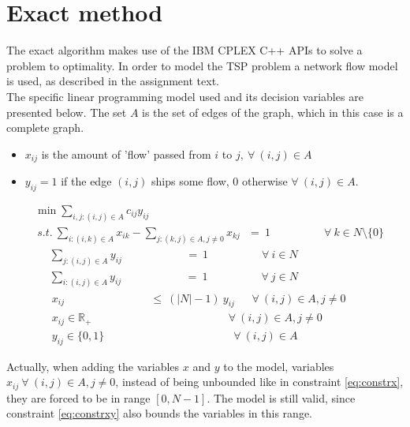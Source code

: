 
\section{Exact method}
\label{chap:cplexm}
The exact algorithm makes use of the IBM CPLEX C++ APIs to solve a problem to optimality. In order to model the TSP problem a network flow model is used, as described in the assignment text. \\
The specific linear programming model used and its decision variables are presented below. The set $A$ is the set of edges of the graph, which in this case is a complete graph.
\begin{itemize}
	\item $x_{ij}$ is the amount of 'flow' passed from $i$ to $j,~\forall~(i,j)\in A$
	\item $y_{ij} = 1$ if the edge $(i,j)$ ships some flow, $0$ otherwise $\forall~(i,j)\in A$.
\end{itemize}
\begin{align}
	&\min \sum\limits_{i,j:(i,j)\in A} c_{ij}y_{ij}\\
	&~s.t.~\sum_{i:(i,k)\in A}x_{ik} - \sum_{j:(k,j)\in A, j\ne 0}x_{kj}~~~=~1~~~~~~~~~~~~~~~~~~~~~~\forall~k \in N \setminus \{0\}\label{eq:flow}\\
	&~~~~~~\sum_{j:(i,j)\in A} y_{ij}~~~~~~~~~~~~~~~~~~~~~~~~~~=~1~~~~~~~~~~~~~~~~~~~~~~\forall~i \in N \label{eq:sumi}\\
	&~~~~~~\sum_{i:(i,j)\in A} y_{ij}~~~~~~~~~~~~~~~~~~~~~~~~~~=~1~~~~~~~~~~~~~~~~~~~~~~\forall~j \in N \label{eq:sumj}\\ 
	&~~~~~~~x_{ij}~~~~~~~~~~~~~~~~~~~~~~~~~~~~~~~~~~~\le~(|N|-1)~y_{ij}~~~~~~~\forall~(i,j) \in A,j\ne 0 \label{eq:constrxy}\\
	&~~~~~~~x_{ij} \in \mathbb{R}_+~~~~~~~~~~~~~~~~~~~~~~~~~~~~~~~~~~~~~~~~~~~~~~~~~~~~~~~~\forall~(i,j) \in A,j\ne 0 \label{eq:constrx}\\
	&~~~~~~~y_{ij} \in \{0,1\}~~~~~~~~~~~~~~~~~~~~~~~~~~~~~~~~~~~~~~~~~~~~~~~~~~~~~\forall~(i,j) \in A
\end{align}

Actually, when adding the variables $x$ and $y$ to the model, variables $x_{ij}~\forall~(i,j) \in A,j\ne 0$, instead of being unbounded like in constraint \ref{eq:constrx}, they are forced to be in range $[0,N-1]$. The model is still valid, since constraint \ref{eq:constrxy} also bounds the variables in this range.

